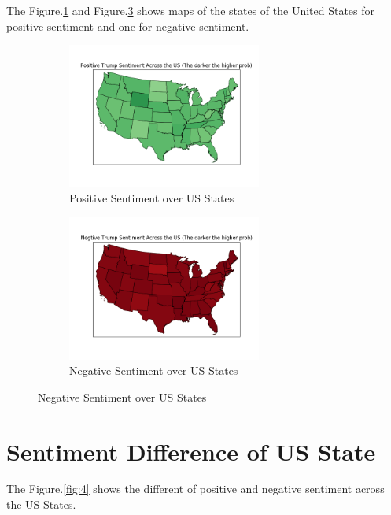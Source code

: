 \documentclass[12pt]{article}
\begin{document}
The Figure.\ref{fig:2} and Figure.\ref{fig:3} shows maps of the states of the United States for positive sentiment and one for negative sentiment.

\begin{figure}[!h]
      \centering
    \begin{subfigure}
        \centering
        \includegraphics[width=0.7\textwidth]{../plots/part2_pos.png}
        \caption{Positive Sentiment over US States}
        \label{fig:2}
    \end{subfigure}%
    \vspace{1em}
    \begin{subfigure}
       \centering
        \includegraphics[width=0.7\textwidth]{../plots/part2_neg.png}
        \caption{Negative Sentiment over US States}
        \label{fig:3}
    \end{subfigure}
\end{figure}


\newpage 
\section{Sentiment Difference of US State}

The Figure.\ref{fig:4} shows the different of positive and negative sentiment across the US States.
\end{document}
